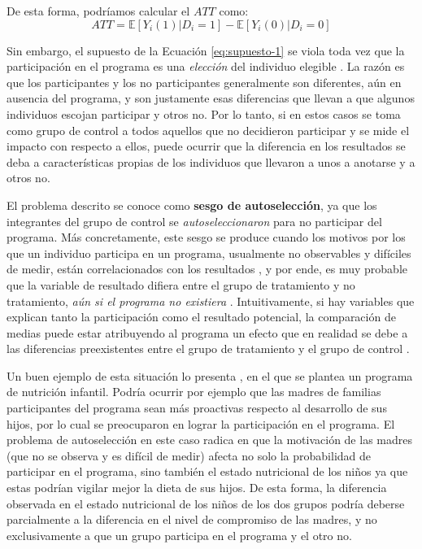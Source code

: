 \documentclass[../../main.tex]{subfiles}
\begin{document}
De esta forma, podríamos calcular el \(ATT\) como:
\begin{equation}
    ATT = \mathbb{E} \left[Y_i(1)|D_i=1\right] - \mathbb{E} \left[Y_i(0)|D_i=0\right]
    \label{eq:ATT-con-supuesto-IC}
\end{equation}

Sin embargo, el supuesto de la Ecuación \ref{eq:supuesto-1} se viola toda vez que la
participación en el programa es una \textit{elección} del individuo elegible
\cite{bernal}. La razón es que los participantes y los no participantes generalmente son
diferentes, aún en ausencia del programa, y son justamente esas diferencias que llevan a
que algunos individuos escojan participar y otros no. Por lo tanto, si en estos casos se
toma como grupo de control a todos aquellos que no decidieron participar y se mide el
impacto con respecto a ellos, puede ocurrir que la diferencia en los resultados se deba a
características propias de los individuos que llevaron a unos a anotarse y a otros no.

El problema descrito se conoce como \textbf{sesgo de autoselección}, ya que los
integrantes del grupo de control se \textit{autoseleccionaron} para no participar del
programa. Más concretamente, este sesgo se produce cuando los motivos por los que un
individuo participa en un programa, usualmente no observables y difíciles de medir, están
correlacionados con los resultados \cite{gertler-2016}, y por ende, es muy probable que la
variable de resultado difiera entre el grupo de tratamiento y no tratamiento, \textit{aún
si el programa no existiera} \cite{bernal}. Intuitivamente, si hay variables que explican
tanto la participación como el resultado potencial, la comparación de medias puede estar
atribuyendo al programa un efecto que en realidad se debe a las diferencias preexistentes
entre el grupo de tratamiento y el grupo de control \cite{bernal}.

Un buen ejemplo de esta situación lo presenta \cite{bernal}, en el que se plantea un
programa de nutrición infantil. Podría ocurrir por ejemplo que las madres de familias
participantes del programa sean más proactivas respecto al desarrollo de sus hijos, por lo
cual se preocuparon en lograr la participación en el programa. El problema de
autoselección en este caso radica en que la motivación de las madres (que no se observa y
es difícil de medir) afecta no solo la probabilidad de participar en el programa, sino
también el estado nutricional de los niños ya que estas podrían vigilar mejor la dieta de
sus hijos. De esta forma, la diferencia observada en el estado nutricional de los niños de
los dos grupos podría deberse parcialmente a la diferencia en el nivel de compromiso de
las madres, y no exclusivamente a que un grupo participa en el programa y el otro no.
\end{document}
